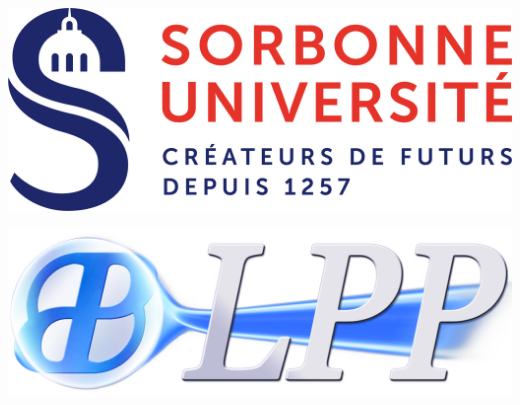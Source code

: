 \thispagestyle{empty}
\begin{center}
\begin{minipage}[l]{0.46\linewidth}
    \begin{flushleft}
	\includegraphics[height=0.3\linewidth]{Couv/logo_SU.png}
  \end{flushleft}
\end{minipage}%
\begin{minipage}[r]{0.46\linewidth}
    \begin{flushright}
	\includegraphics[height=0.3\linewidth]{Couv/logo_LPP.png}
  \end{flushright}
\end{minipage}%

\bigskip \bigskip \bigskip
\LARGE{\EAnom} \\
\large{\EDnom} \\
\textit{{\LABname}}\\
\textit{\LABequipe} \\

\bigskip %

\linia
\bigskip
\LARGE{\textbf{\titrefr}} \\
\Large{\textit{\soustitrefr}} \\
\bigskip
\linia


\end{center}
